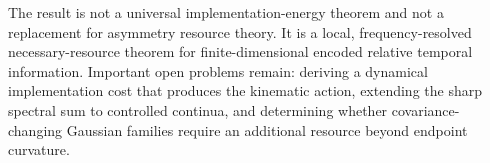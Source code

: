 \documentclass[aps,pra,preprint,nofootinbib]{revtex4-2}
\begin{document}
The result is not a universal implementation-energy theorem and not a replacement for asymmetry resource theory. It is a local, frequency-resolved necessary-resource theorem for finite-dimensional encoded relative temporal information. Important open problems remain: deriving a dynamical implementation cost that produces the kinematic action, extending the sharp spectral sum to controlled continua, and determining whether covariance-changing Gaussian families require an additional resource beyond endpoint curvature.



\end{document}
